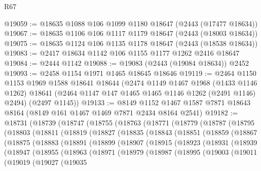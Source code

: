 \begin{lexlean}{R67}
\begin{coremodule}
@19059 := @18635 @1088 @106 @1099 @1180 @18647 (@2443 (@17477 @18634))
@19067 := @18635 @1106 @106 @1117 @1179 @18647 (@2443 (@18003 @18634))
@19075 := @18635 @1124 @106 @1135 @1178 @18647 (@2443 (@18538 @18634))
@19083 := @2417 @18634 @1142 @106 @1155 @1177 @1262 @2416 @18647
@19084 := @2444 @1142
@19088 := @19083 (@2443 (@19084 @18634)) @2452
@19093 := @2458 @1154 @1971 @1465 @18645 @18646
@19119 := @2464
    @1150
    @1153
    @1969
    @1588
    @18641
    @18644
    (@2474
      @1149
      @1467
      @1968
      (@1433 @1146 @1262)
      @18641
      (@2464 @1147 @147 @1465 @1465 @1146 @1262 (@2491 @1146) @2494)
      (@2497 @1145))
@19133 := @8149
    @1152
    @1467
    @1587
    @7871
    @18643
    @8164
    (@8149 @161 @1467 @1469 @7871 @2434 @8164 @2541)
@19182 := @18731
    (@18739
      (@18747
        (@18755
          (@18763
            (@18771
              (@18779
                (@18787
                  (@18795
                    (@18803
                      (@18811
                        (@18819
                          (@18827
                            (@18835
                              (@18843
                                (@18851
                                  (@18859
                                    (@18867
                                      (@18875
                                        (@18883
                                          (@18891
                                            (@18899
                                              (@18907
                                                (@18915
                                                  (@18923
                                                    (@18931
                                                      (@18939
                                                        (@18947
                                                          (@18955
                                                            (@18963
                                                              (@18971
                                                                (@18979
                                                                  (@18987
                                                                    (@18995
                                                                      (@19003
                                                                        (@19011
                                                                          (@19019
                                                                            (@19027
                                                                              (@19035

\end{coremodule}
\end{lexlean}

